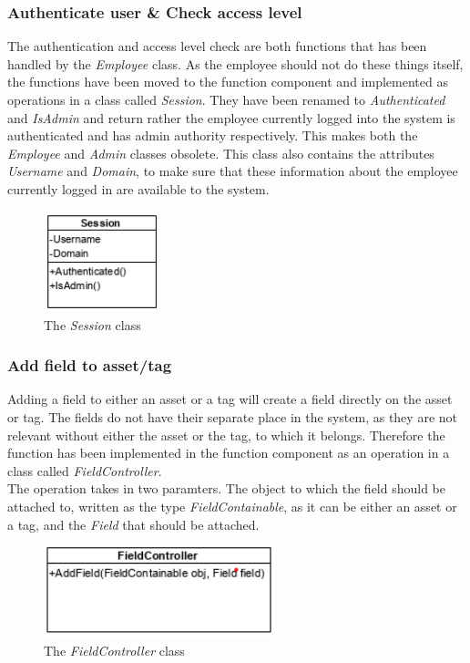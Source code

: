 \subsubsection{Authenticate user \& Check access level}
The authentication and access level check are both functions that has been handled by the \textit{Employee} class. As the employee should not do these things itself, the functions have been moved to the function component and implemented as operations in a class called \textit{Session}. They have been renamed to \textit{Authenticated} and \textit{IsAdmin} and return rather the employee currently logged into the system is authenticated and has admin authority respectively. This makes both the \textit{Employee} and \textit{Admin} classes obsolete. This class also contains the attributes \textit{Username} and \textit{Domain}, to make sure that these information about the employee currently logged in are available to the system.
\begin{figure}[H]
    \centering
    \includegraphics[width=0.3\textwidth]{figures/FunctionComponent/Session.png}
    \caption{The \textit{Session} class}
    \label{fig:session_class}
\end{figure}

\subsubsection{Add field to asset/tag}
Adding a field to either an asset or a tag will create a field directly on the asset or tag. The fields do not have their separate place in the system, as they are not relevant without either the asset or the tag, to which it belongs. Therefore the function has been implemented in the function component as an operation in a class called \textit{FieldController}.\\
The operation takes in two paramters. The object to which the field should be attached to, written as the type \textit{FieldContainable}, as it can be either an asset or a tag, and the \textit{Field} that should be attached.
\begin{figure}[H]
    \centering
    \includegraphics[width=0.6\textwidth]{figures/FunctionComponent/FieldController.png}
    \caption{The \textit{FieldController} class}
    \label{fig:FieldController}
\end{figure}

